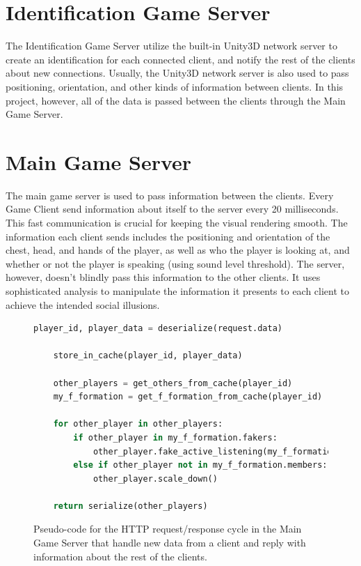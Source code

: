 \documentclass[]{simple-thesis}
\begin{document}
\section{Identification Game Server}

The Identification Game Server utilize the built-in Unity3D network server to create an identification for each connected client, and notify the rest of the clients about new connections.
Usually, the Unity3D network server is also used to pass positioning, orientation, and other kinds of information between clients.
In this project, however, all of the data is passed between the clients through the Main Game Server.

\section{Main Game Server}

The main game server is used to pass information between the clients.
Every Game Client send information about itself to the server every 20 milliseconds.
This fast communication is crucial for keeping the visual rendering smooth.
The information each client sends includes the positioning and orientation of the chest, head, and hands of the player, as well as who the player is looking at, and whether or not the player is speaking (using sound level threshold).
The server, however, doesn't blindly pass this information to the other clients.
It uses sophisticated analysis to manipulate the information it presents to each client to achieve the intended social illusions.

\begin{figure}
  \begin{lstlisting}[language=Python]
    player_id, player_data = deserialize(request.data)

    store_in_cache(player_id, player_data)

    other_players = get_others_from_cache(player_id)
    my_f_formation = get_f_formation_from_cache(player_id)

    for other_player in other_players:
        if other_player in my_f_formation.fakers:
            other_player.fake_active_listening(my_f_formation.speaker)
        else if other_player not in my_f_formation.members:
            other_player.scale_down()
           
    return serialize(other_players)
  \end{lstlisting}
  \caption{Pseudo-code for the HTTP request/response cycle in the Main Game Server that handle new data from a client and reply with information about the rest of the clients.}
  \label{fig:system:main_server_pseudocode}
\end{figure}
\end{document}
